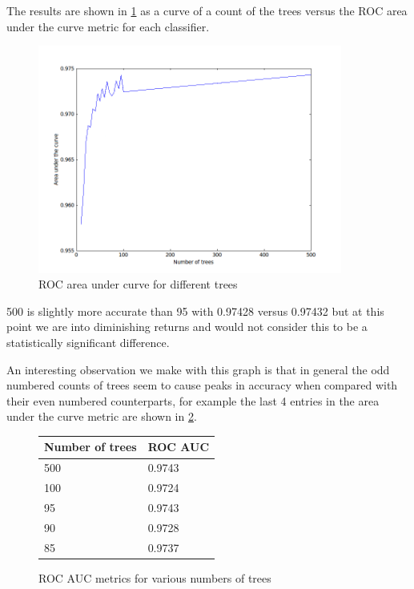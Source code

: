 \documentclass[ %
                    author={Sam Phippen},
                supervisor={Dr. Rafal Bogacz},
                     title={Real time voice activity detectors in noisy personal computing environments},
                  subtitle={},
                    degree={MEng},
                      year={2012} ]{thesis}
\begin{document}
The results are shown in \ref{fig:roc-trees} as a curve of a count of the
trees versus the ROC area under the curve metric for each classifier.

\begin{figure}
    \includegraphics[width=10cm]{roc_differing_trees.png}
    \caption{ROC area under curve for different trees}
    \label{fig:roc-trees}
\end{figure}

500 is slightly more accurate than 95 with 0.97428 versus 0.97432 but at this
point we are into diminishing returns and would not consider this to be a
statistically significant difference.

An interesting observation we make with this graph is that in general the odd
numbered counts of trees seem to cause peaks in accuracy when compared with their
even numbered counterparts, for example the last 4 entries in the area under the
curve metric are shown in \ref{table:roc_spike}.

\begin{figure}
    \begin{tabular}{|l|l|}
        Number of trees & ROC AUC \\ \hline
        500             & 0.9743 \\ \hline
        100             & 0.9724 \\ \hline
        95              & 0.9743 \\ \hline
        90              & 0.9728 \\ \hline
        85              & 0.9737 \\ \hline
    \end{tabular}
    \caption{ROC AUC metrics for various numbers of trees}
    \label{table:roc_spike}
\end{figure}
\end{document}
